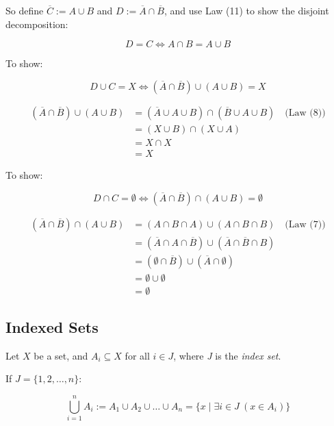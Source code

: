 So define \( \overline{C} := A \cup B \) and \( D := \overline{A} \cap \overline{B} \),
and use Law (11) to show the disjoint decomposition:

\[
	D = C \iff A \cap B = A \cup B
\]

To show:

\[
	D \cup C = X \iff (\overline{A} \cap \overline{B}) \cup (A \cup B) = X
\]

\begin{align*}
	(\overline{A} \cap \overline{B}) \cup (A \cup B)
	 & = (\overline{A} \cup A \cup B) \cap (\overline{B} \cup A \cup B) \quad \text{(Law (8))} \\
	 & = (X \cup B) \cap (X \cup A)                                                            \\
	 & = X \cap X                                                                              \\
	 & = X
\end{align*}

To show:

\[
	D \cap C = \emptyset \iff (\overline{A} \cap \overline{B}) \cap (A \cup B) = \emptyset
\]

\begin{align*}
	(\overline{A} \cap \overline{B}) \cap (A \cup B)
	 & = (A \cap B \cap A) \cup (A \cap B \cap B) \quad \text{(Law (7))}                      \\
	 & = (\overline{A} \cap A \cap \overline{B}) \cup (\overline{A} \cap \overline{B} \cap B) \\
	 & = (\emptyset \cap \overline{B}) \cup (\overline{A} \cap \emptyset)                     \\
	 & = \emptyset \cup \emptyset                                                             \\
	 & = \emptyset
\end{align*}

\QED

\subsection{Indexed Sets}

Let \(X\) be a set, and \( A_i \subseteq X \) for all \( i \in J \), where \emph{J} is the 
\emph{index set}.

If \( J = \{1, 2, \dots, n\} \):

\[
	\bigcup_{i=1}^{n} A_i := A_1 \cup A_2 \cup \dots \cup A_n = \{ x \mid \exists i \in J \ (x \in A_i) \}
\]

